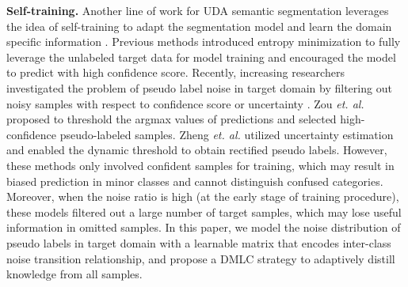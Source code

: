 \documentclass[final]{cvpr}
\begin{document}
\textbf{Self-training.}
Another line of work for UDA semantic segmentation leverages the idea of self-training to adapt the segmentation model and learn the domain specific information \cite{mei2020instance, zhang2019category, zhu2020improving}. Previous methods \cite{chen2019domain, zou2019confidence} introduced entropy minimization to fully leverage the unlabeled target data for model training and encouraged the model to predict with high confidence score. Recently, increasing researchers investigated the problem of pseudo label noise in target domain by filtering out noisy samples with respect to confidence score or uncertainty \cite{iqbal2020mlsl, lian2019constructing, pan2020unsupervised, sakaridis2019guided, zheng2020rectifying, zou2018unsupervised}. Zou \textit{et. al.} \cite{zou2018unsupervised} proposed to threshold the argmax values of predictions and selected high-confidence pseudo-labeled samples. Zheng \textit{et. al.} \cite{zheng2020rectifying} utilized uncertainty estimation and enabled the dynamic threshold to obtain rectified pseudo labels. However, these methods only involved confident samples for training, which may result in biased prediction in minor classes and cannot distinguish confused categories. Moreover, when the noise ratio is high (at the early stage of training procedure), these models filtered out a large number of target samples, which may lose useful information in omitted samples. In this paper, we model the noise distribution of pseudo labels in target domain with a learnable matrix that encodes inter-class noise transition relationship, and propose a DMLC strategy to adaptively distill knowledge from all samples. 

\vspace{-0.1cm}
\end{document}
